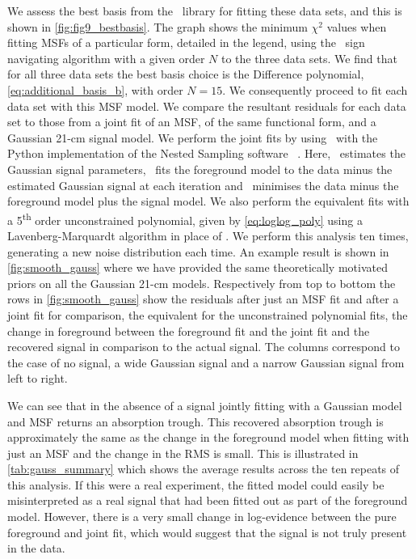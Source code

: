 We assess the best basis from the \maxsmooth~library for fitting these data sets, and this is shown in \cref{fig:fig9_bestbasis}. The graph shows the minimum $\chi^2$ values when fitting MSFs of a particular form, detailed in the legend, using the \maxsmooth~sign navigating algorithm with a given order $N$ to the three data sets. We find that for all three data sets the best basis choice is the Difference polynomial, \cref{eq:additional_basis_b}, with order $N = 15$. We consequently proceed to fit each data set with this MSF model. We compare the resultant residuals for each data set to those from a joint fit of an MSF, of the same functional form, and a Gaussian 21-cm signal model. We perform the joint fits by using \maxsmooth~with the Python implementation of the Nested Sampling software \multinest~\citep[][]{PyMultiNest,multinest_2008,multinest_2009, multinest_2019}. Here, \multinest~estimates the Gaussian signal parameters, \maxsmooth~fits the foreground model to the data minus the estimated Gaussian signal at each iteration and \multinest~minimises the data minus the foreground model plus the signal model. We also perform the equivalent fits with a 5\textsuperscript{th} order unconstrained polynomial, given by \cref{eq:loglog_poly} using a Lavenberg-Marquardt \citep{Levenberg1944, Marquardt1963} algorithm in place of \maxsmooth. We perform this analysis ten times, generating a new noise distribution each time. An example result is shown in \cref{fig:smooth_gauss} where we have provided the same theoretically motivated priors on all the Gaussian 21-cm models. Respectively from top to bottom the rows in \cref{fig:smooth_gauss} show the residuals after just an MSF fit and after a joint fit for comparison, the equivalent for the unconstrained polynomial fits, the change in foreground between the foreground fit and the joint fit and the recovered signal in comparison to the actual signal. The columns correspond to the case of no signal, a wide Gaussian signal and a narrow Gaussian signal from left to right.

We can see that in the absence of a signal jointly fitting with a Gaussian model and MSF returns an absorption trough. This recovered absorption trough is approximately the same as the change in the foreground model when fitting with just an MSF and the change in the RMS is small. This is illustrated in \cref{tab:gauss_summary} which shows the average results across the ten repeats of this analysis. If this were a real experiment, the fitted model could easily be misinterpreted as a real signal that had been fitted out as part of the foreground model. However, there is a very small change in log-evidence between the pure foreground and joint fit, which would suggest that the signal is not truly present in the data.

